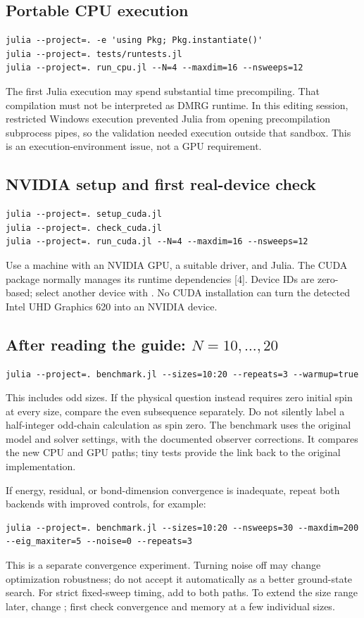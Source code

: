 \subsection{Portable CPU execution}
\begin{lstlisting}
julia --project=. -e 'using Pkg; Pkg.instantiate()'
julia --project=. tests/runtests.jl
julia --project=. run_cpu.jl --N=4 --maxdim=16 --nsweeps=12
\end{lstlisting}
The first Julia execution may spend substantial time precompiling. That compilation must not be interpreted as DMRG runtime. In this editing session, restricted Windows execution prevented Julia from opening precompilation subprocess pipes, so the validation needed execution outside that sandbox. This is an execution-environment issue, not a GPU requirement.

\subsection{NVIDIA setup and first real-device check}
\begin{lstlisting}
julia --project=. setup_cuda.jl
julia --project=. check_cuda.jl
julia --project=. run_cuda.jl --N=4 --maxdim=16 --nsweeps=12
\end{lstlisting}
Use a machine with an NVIDIA GPU, a suitable driver, and Julia. The CUDA package normally manages its runtime dependencies [4]. Device IDs are zero-based; select another device with . No CUDA installation can turn the detected Intel UHD Graphics 620 into an NVIDIA device.

\subsection{After reading the guide: $N=10,\ldots,20$}
\begin{lstlisting}
julia --project=. benchmark.jl --sizes=10:20 --repeats=3 --warmup=true
\end{lstlisting}
This includes odd sizes. If the physical question instead requires zero initial spin at every size, compare the even subsequence separately. Do not silently label a half-integer odd-chain calculation as spin zero. The benchmark uses the original model and solver settings, with the documented observer corrections. It compares the new CPU and GPU paths; tiny tests provide the link back to the original implementation.

If energy, residual, or bond-dimension convergence is inadequate, repeat both backends with improved controls, for example:
\begin{lstlisting}
julia --project=. benchmark.jl --sizes=10:20 --nsweeps=30 --maxdim=200 --eig_maxiter=5 --noise=0 --repeats=3
\end{lstlisting}
This is a separate convergence experiment. Turning noise off may change optimization robustness; do not accept it automatically as a better ground-state search. For strict fixed-sweep timing, add  to both paths. To extend the size range later, change ; first check convergence and memory at a few individual sizes.

